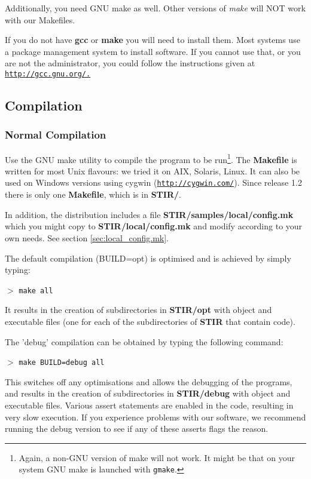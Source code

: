 \documentclass{article}
\def\R2Lurl#1#2{\mbox{\href{#1}{\tt #2}}}
\newcommand{\cmdline}[1]{\par \noindent $>$ \texttt{#1}\par}
\begin{document}
Additionally, you need GNU make as well. Other versions of \textit{make} 
will NOT work with our Makefiles.


If you do not have \textbf{gcc} or \textbf{make} you will need to 
install them. Most systems use a package management system to install software. 
If you cannot use that, or you are not the administrator, you 
could follow the instructions given at \R2Lurl{http://gcc.gnu.org/ }{http://gcc.gnu.org/.}



\subsection{
Compilation}

\subsubsection{
Normal Compilation}
\label{sec:normalcompilation}
Use the GNU make utility to compile the program to be run\footnote{{\small Again, 
a non-GNU version of make will not work. It might be that on 
your system GNU make is launched with \texttt{gmake}.}}. The \textbf{Makefile} 
is written for most Unix flavours: we tried it on AIX, Solaris, 
Linux. It can also be used on Windows versions using cygwin (\R2Lurl{http://cygwin.com/}{http://cygwin.com/}). 
Since release 1.2 there is only one \textbf{Makefile}, which is in \textbf{STIR/}.


In addition, the distribution includes a file \textbf{STIR/samples/local/config.mk} 
which you might copy to \textbf{STIR/local/config.mk} and modify according 
to your own needs. See section \ref{sec:local_config.mk}.


The default compilation (BUILD=opt) is optimised and is achieved 
by simply typing:
\cmdline{make all}


It results in the creation of subdirectories in \textbf{STIR/opt} 
with object and executable files (one for each of the subdirectories 
of \textbf{STIR} that contain code).


The 'debug' compilation can be obtained by typing the following 
command:
\cmdline{make BUILD=debug all}
\noindent
This switches off any optimisations and allows the debugging 
of the programs, and results in the creation of subdirectories 
in \textbf{STIR/debug} with object and executable files. Various assert 
statements are enabled in the code, resulting in very slow execution. 
If you experience problems with our software, we recommend running 
the debug version to see if any of these asserts flags the reason.
\end{document}
